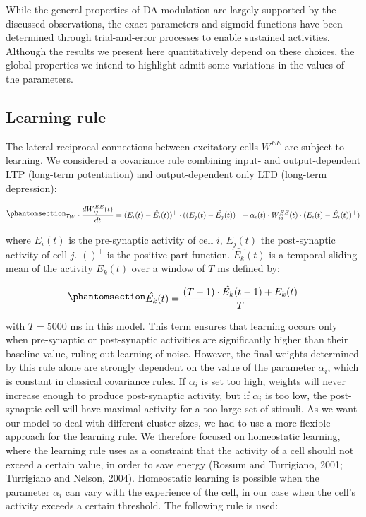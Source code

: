 \documentclass[
  11pt,
  a4paper,
]{scrbook}
\begin{document}
While the general properties of DA modulation are largely supported by
the discussed observations, the exact parameters and sigmoid functions
have been determined through trial-and-error processes to enable
sustained activities. Although the results we present here
quantitatively depend on these choices, the global properties we intend
to highlight admit some variations in the values of the parameters.

\subsection{Learning rule}\label{learning-rule}

The lateral reciprocal connections between excitatory cells \(W^{EE}\)
are subject to learning. We considered a covariance rule combining
input- and output-dependent LTP (long-term potentiation) and
output-dependent only LTD (long-term depression):

\begin{equation}\phantomsection\label{eq-jocn:weight}{\begin{aligned}
    \tau_W \cdot \frac{d W^{EE}_{i j} (t)}{d t} = (E_i (t) - \hat{E_i} (t))^+ \cdot ( (E_j (t) - \hat{E_j} (t) )^+  - \alpha_i (t) \cdot W^{EE}_{i j} (t) \cdot (E_i (t) - \hat{E_i} (t))^+ )
    \end{aligned}
}\end{equation}

where \(E_i (t)\) is the pre-synaptic activity of cell \(i\),
\(E_j (t)\) the post-synaptic activity of cell \(j\). \(()^+\) is the
positive part function. \(\hat{E_k} (t)\) is a temporal sliding-mean of
the activity \(E_k (t)\) over a window of \(T\) ms defined by:

\begin{equation}\phantomsection\label{eq-jocn:slidingmean}{\begin{aligned}
    \hat{E_k} (t) = \frac{(T-1) \cdot \hat{E_k} (t - 1) + E_k (t)}{T}
    \end{aligned}
}\end{equation}

with \(T = 5000\) ms in this model. This term ensures that learning
occurs only when pre-synaptic or post-synaptic activities are
significantly higher than their baseline value, ruling out learning of
noise. However, the final weights determined by this rule alone are
strongly dependent on the value of the parameter \(\alpha_i\), which is
constant in classical covariance rules. If \(\alpha_i\) is set too high,
weights will never increase enough to produce post-synaptic activity,
but if \(\alpha_i\) is too low, the post-synaptic cell will have maximal
activity for a too large set of stimuli. As we want our model to deal
with different cluster sizes, we had to use a more flexible approach for
the learning rule. We therefore focused on homeostatic learning, where
the learning rule uses as a constraint that the activity of a cell
should not exceed a certain value, in order to save energy (Rossum and
Turrigiano, 2001; Turrigiano and Nelson, 2004). Homeostatic learning is
possible when the parameter \(\alpha_i\) can vary with the experience of
the cell, in our case when the cell's activity exceeds a certain
threshold. The following rule is used:
\end{document}
